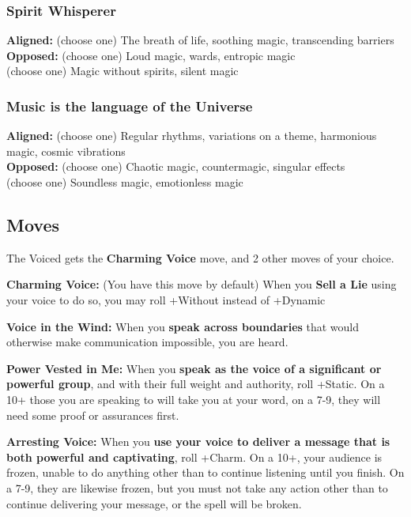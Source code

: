 \documentclass[10pt,twoside,openright]{memoir}
\begin{document}
\hypertarget{spirit-whisperer}{%
\subsubsection{Spirit Whisperer}\label{spirit-whisperer}}

\textbf{Aligned:} (choose one) The breath of life, soothing magic,
transcending barriers\\
\textbf{Opposed:} (choose one) Loud magic, wards, entropic magic\\
(choose one) Magic without spirits, silent magic

\hypertarget{music-is-the-language-of-the-universe}{%
\subsubsection{Music is the language of the
Universe}\label{music-is-the-language-of-the-universe}}

\textbf{Aligned:} (choose one) Regular rhythms, variations on a theme,
harmonious magic, cosmic vibrations\\
\textbf{Opposed:} (choose one) Chaotic magic, countermagic, singular
effects\\
(choose one) Soundless magic, emotionless magic

\hypertarget{moves-7}{%
\subsection{Moves}\label{moves-7}}

The Voiced gets the \textbf{Charming Voice} move, and 2 other moves of
your choice.

\textbf{Charming Voice:} (You have this move by default) When you
\textbf{Sell a Lie} using your voice to do so, you may roll +Without
instead of +Dynamic

\textbf{Voice in the Wind:} When you \textbf{speak across boundaries}
that would otherwise make communication impossible, you are heard.

\textbf{Power Vested in Me:} When you \textbf{speak as the voice of a
significant or powerful group}, and with their full weight and
authority, roll +Static. On a 10+ those you are speaking to will take
you at your word, on a 7-9, they will need some proof or assurances
first.

\textbf{Arresting Voice:} When you \textbf{use your voice to deliver a
message that is both powerful and captivating}, roll +Charm. On a 10+,
your audience is frozen, unable to do anything other than to continue
listening until you finish. On a 7-9, they are likewise frozen, but you
must not take any action other than to continue delivering your message,
or the spell will be broken.
\end{document}
